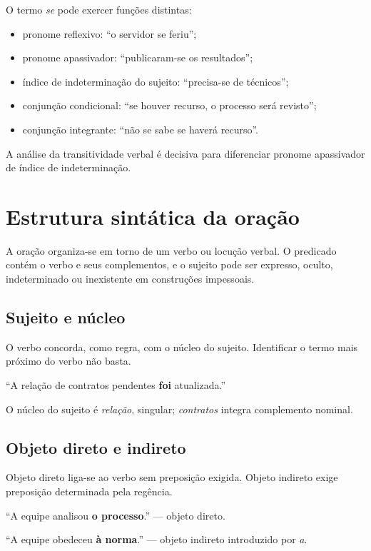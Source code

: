 O termo \emph{se} pode exercer funções distintas:
\begin{itemize}
\item pronome reflexivo: ``o servidor se feriu'';
\item pronome apassivador: ``publicaram-se os resultados'';
\item índice de indeterminação do sujeito: ``precisa-se de técnicos'';
\item conjunção condicional: ``se houver recurso, o processo será revisto'';
\item conjunção integrante: ``não se sabe se haverá recurso''.
\end{itemize}

A análise da transitividade verbal é decisiva para diferenciar pronome apassivador de índice de indeterminação.

\section{Estrutura sintática da oração}

A oração organiza-se em torno de um verbo ou locução verbal. O predicado contém o verbo e seus complementos, e o sujeito pode ser expresso, oculto, indeterminado ou inexistente em construções impessoais.

\subsection{Sujeito e núcleo}

O verbo concorda, como regra, com o núcleo do sujeito. Identificar o termo mais próximo do verbo não basta.

``A relação de contratos pendentes \textbf{foi} atualizada.''

O núcleo do sujeito é \emph{relação}, singular; \emph{contratos} integra complemento nominal.

\subsection{Objeto direto e indireto}

Objeto direto liga-se ao verbo sem preposição exigida. Objeto indireto exige preposição determinada pela regência.

``A equipe analisou \textbf{o processo}.'' — objeto direto.

``A equipe obedeceu \textbf{à norma}.'' — objeto indireto introduzido por \emph{a}.

